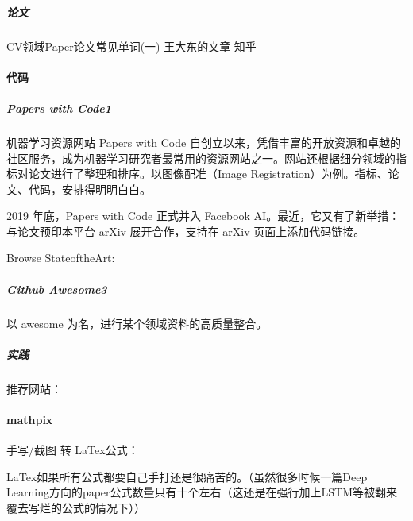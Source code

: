 \documentclass[letterpaper,11pt,english]{sphinxmanual}
\begin{document}
\subparagraph{论文}
\label{\detokenize{chapter_skill/research:id7}}

CV领域Paper论文常见单词(一) \sphinxhyphen{} 王大东的文章 \sphinxhyphen{} 知乎



\paragraph{代码}
\label{\detokenize{chapter_skill/research:id8}}

\subparagraph{Papers with Code1\sphinxfootnotemark[204]}
\label{\detokenize{chapter_skill/research:papers-with-code1}}%
\begin{footnotetext}[204]\sphinxAtStartFootnote
{}
%
\end{footnotetext}\ignorespaces 
机器学习资源网站 Papers with Code
自创立以来，凭借丰富的开放资源和卓越的社区服务，成为机器学习研究者最常用的资源网站之一。网站还根据细分领域的指标对论文进行了整理和排序。以图像配准（Image
Registration）为例。指标、论文、代码，安排得明明白白。

2019 年底，Papers with Code 正式并入 Facebook
AI。最近，它又有了新举措：与论文预印本平台 arXiv 展开合作，支持在 arXiv
页面上添加代码链接。

Browse State\sphinxhyphen{}of\sphinxhyphen{}the\sphinxhyphen{}Art: 


\subparagraph{Github \sphinxhyphen{} Awesome3}
\label{\detokenize{chapter_skill/research:github-awesome3}}
以 awesome 为名，进行某个领域资料的高质量整合。


\subparagraph{实践}
\label{\detokenize{chapter_skill/research:id9}}
推荐网站：


\paragraph{mathpix}
\label{\detokenize{chapter_skill/research:mathpix}}
手写/截图 转 LaTex公式：

LaTex如果所有公式都要自己手打还是很痛苦的。（虽然很多时候一篇Deep
Learning方向的paper公式数量只有十个左右（这还是在强行加上LSTM等被翻来覆去写烂的公式的情况下））

\end{document}

